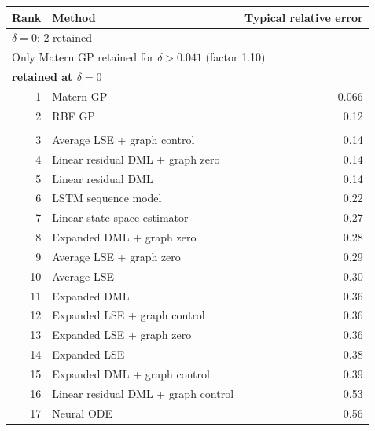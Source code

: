 \begin{tabular}{rlr}
\toprule
Rank & Method & Typical relative error \\
\midrule
\multicolumn{3}{l}{\(\delta=0\): 2 retained} \\
\multicolumn{3}{l}{Only Matern GP retained for \(\delta>0.041\) (factor 1.10)} \\
\multicolumn{3}{l}{\textbf{retained at \(\delta=0\)}} \\
1 & Matern GP & 0.066 \\
2 & RBF GP & 0.12 \\
\addlinespace[2pt]
\multicolumn{3}{l}{\textbf{not retained at \(\delta=0\)}} \\
3 & Average LSE + graph control & 0.14 \\
4 & Linear residual DML + graph zero & 0.14 \\
5 & Linear residual DML & 0.14 \\
6 & LSTM sequence model & 0.22 \\
7 & Linear state-space estimator & 0.27 \\
8 & Expanded DML + graph zero & 0.28 \\
9 & Average LSE + graph zero & 0.29 \\
10 & Average LSE & 0.30 \\
11 & Expanded DML & 0.36 \\
12 & Expanded LSE + graph control & 0.36 \\
13 & Expanded LSE + graph zero & 0.36 \\
14 & Expanded LSE & 0.38 \\
15 & Expanded DML + graph control & 0.39 \\
16 & Linear residual DML + graph control & 0.53 \\
17 & Neural ODE & 0.56 \\
\bottomrule
\end{tabular}
